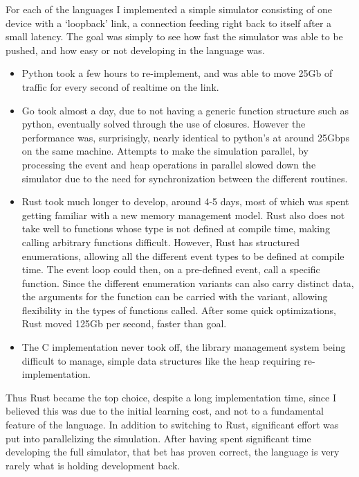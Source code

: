 For each of the languages I implemented a simple simulator consisting of one device with a `loopback' link, a connection feeding right back to itself after a small latency.
The goal was simply to see how fast the simulator was able to be pushed, and how easy or not developing in the language was.
\begin{itemize}
\item Python took a few hours to re-implement, and was able to move 25Gb of traffic for every second of realtime on the link.

\item Go took almost a day, due to not having a generic function structure such as python, eventually solved through the use of closures.
However the performance was, surprisingly, nearly identical to python's at around 25Gbps on the same machine.
Attempts to make the simulation parallel, by processing the event and heap operations in parallel slowed down the simulator due to the need for synchronization between the different routines.

\item Rust took much longer to develop, around 4-5 days, most of which was spent getting familiar with a new memory management model.
Rust also does not take well to functions whose type is not defined at compile time, making calling arbitrary functions difficult.
However, Rust has structured enumerations, allowing all the different event types to be defined at compile time.
The event loop could then, on a pre-defined event, call a specific function.
Since the different enumeration variants can also carry distinct data, the arguments for the function can be carried with the variant, allowing flexibility in the types of functions called.
After some quick optimizations, Rust moved 125Gb per second, faster than goal. 

\item The C implementation never took off, the library management system being difficult to manage, simple data structures like the heap requiring re-implementation.
\end{itemize}

Thus Rust became the top choice, despite a long implementation time, since I believed this was due to the initial learning cost, and not to a fundamental feature of the language.
In addition to switching to Rust, significant effort was put into parallelizing the simulation.
After having spent significant time developing the full simulator, that bet has proven correct, the language is very rarely what is holding development back.



